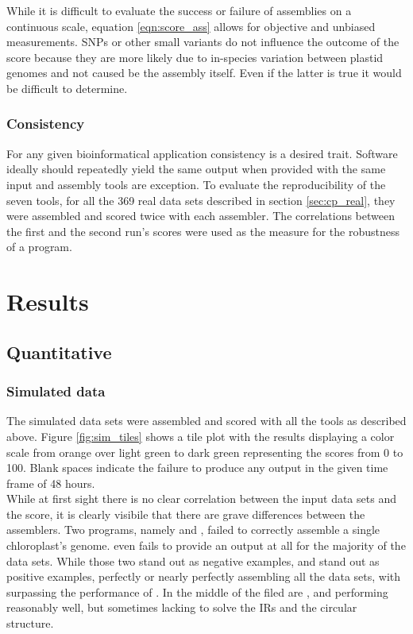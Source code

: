 While it is difficult to evaluate the success or failure of assemblies on a continuous
scale, equation \ref{eqn:score_ass} allows for objective and unbiased measurements. SNPs
or other small variants do not influence the outcome of the score because they are more
likely due to in-species variation between plastid genomes and not caused be the assembly
itself. Even if the latter is true it would be difficult to determine.
  
\subsubsection{Consistency}
For any given bioinformatical application consistency is a desired trait. Software ideally
should repeatedly yield the same output when provided with the same input and assembly
tools are exception. To evaluate the reproducibility of the seven tools, for all the 369 real
data sets described in section \ref{sec:cp_real}, they were assembled and scored twice
with each assembler. The correlations between the first and the second run's scores were
used as the measure for the robustness of a program.

\section{Results} \label{results:ca}
\subsection{Quantitative}
\subsubsection{Simulated data}
\label{results:sim}

The simulated data sets were assembled and scored with all the tools as described
above. Figure \ref{fig:sim_tiles} shows a tile plot with the results displaying a color
scale from orange over light
green to dark green representing the scores from 0 to 100. Blank spaces indicate the failure to produce any output in the given time frame of 48 hours. \\
While at first sight there is no clear correlation between the input data sets and the
score, it is clearly visibile that there are grave differences between the assemblers. Two
programs, namely \cassp \hspace{0.25ex} and \ioga, failed to correctly assemble a single
chloroplast's genome. \ioga \hspace{0.25ex} even fails to provide an output at all for the
majority of the data sets. While those two stand out as negative examples, \fp
\hspace{0.25ex} and \go \hspace{0.25ex} stand out as positive examples, perfectly or nearly
perfectly assembling all the data sets, with \go \hspace{0.25ex} surpassing the performance
of \fp. In the middle of the filed are \ce, \oa \hspace{0.25ex} and \np \hspace{0.25ex}
performing reasonably well, but sometimes lacking to solve the IRs and the circular
structure.

